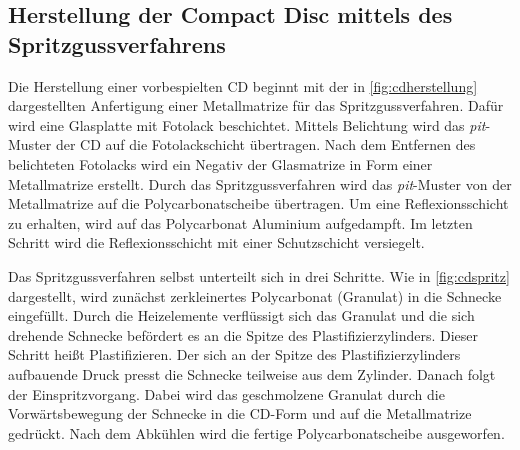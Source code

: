 \subsection{Herstellung der Compact Disc mittels des Spritzgussverfahrens}
\label{subsec:cdherstellung}

Die Herstellung einer vorbespielten CD beginnt mit der in
\autoref{fig:cdherstellung} dargestellten Anfertigung einer Metallmatrize für
das Spritzgussverfahren. Dafür wird eine Glasplatte mit Fotolack beschichtet.
Mittels Belichtung wird das \textit{pit}-Muster der CD auf die Fotolackschicht
übertragen. Nach dem Entfernen des belichteten Fotolacks wird ein Negativ der
Glasmatrize in Form einer Metallmatrize erstellt. Durch das Spritzgussverfahren
wird das \textit{pit}-Muster von der Metallmatrize auf die Polycarbonatscheibe
übertragen. Um eine Reflexionsschicht zu erhalten, wird auf das Polycarbonat
Aluminium aufgedampft. Im letzten Schritt wird die Reflexionsschicht mit einer
Schutzschicht versiegelt. \cite{cdp}


Das Spritzgussverfahren selbst unterteilt sich in drei Schritte. Wie in
\autoref{fig:cdspritz} dargestellt, wird zunächst zerkleinertes Polycarbonat
(Granulat) in die Schnecke eingefüllt. Durch die Heizelemente verflüssigt sich
das Granulat und die sich drehende Schnecke befördert es an die Spitze des
Plastifizierzylinders. Dieser Schritt heißt Plastifizieren.
Der sich an der Spitze des Plastifizierzylinders aufbauende Druck presst die
Schnecke teilweise aus dem Zylinder. Danach folgt der Einspritzvorgang. Dabei
wird das geschmolzene Granulat durch die Vorwärtsbewegung der Schnecke in die
CD-Form und auf die Metallmatrize gedrückt. Nach dem Abkühlen wird die fertige
Polycarbonatscheibe ausgeworfen. \cite{cdpf}

